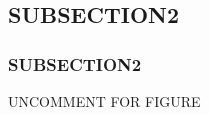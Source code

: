 \subsection{SUBSECTION2}
\begin{frame}[fragile]
\frametitle{SUBSECTION2}
UNCOMMENT FOR FIGURE %
\end{frame}